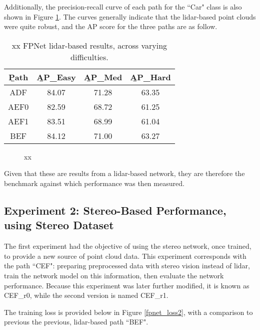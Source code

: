 Additionally, the precision-recall curve of each path for the ``Car" class is also shown in Figure \ref{fpnet_pr1}. The curves generally indicate that the lidar-based point clouds were quite robust, and the AP score for the three paths are as follow.

\begin{table}[ht]
	\centering
	\caption{xx FPNet lidar-based results, across varying difficulties.}
	\begin{tabular}{|c|c|c|c|}
		\hline
		\b{Path} & \b{AP\_Easy} & \b{AP\_Med} & \b{AP\_Hard} \\ \hline
		  ADF    &    84.07     &    71.28    &    63.35     \\ \hline
		  AEF0   &    82.59     &    68.72    &    61.25     \\ \hline
		  AEF1   &    83.51     &    68.99    &    61.04     \\ \hline
		  BEF    &    84.12     &    71.00    &    63.27     \\ \hline
	\end{tabular}
	\label{fpnet_ap1}
\end{table}


\begin{figure}[H]
	\centering
	\caption{xx}
	\label{fpnet_pr1}
\end{figure}




Given that these are results from a lidar-based network, they are therefore the benchmark against which performance was then measured. 

\subsection{Experiment 2: Stereo-Based Performance, using Stereo Dataset}
The first experiment had the objective of using the stereo network, once trained, to provide a new source of point cloud data. This experiment corresponds with the path ``CEF": preparing preprocessed data with stereo vision instead of lidar, train the network model on this information, then evaluate the network performance. Because this experiment was later further modified, it is known as CEF\_r0, while the second version is named CEF\_r1. 


The training loss is provided below in Figure \ref{fpnet_loss2}, with a comparison to previous the previous, lidar-based path ``BEF". 

